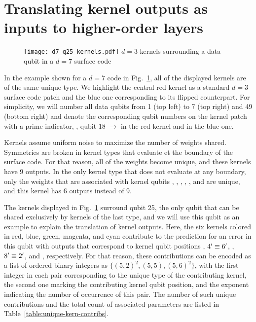\section{Translating kernel outputs as inputs to higher-order layers}

\begin{figure*}[htb]
\centering
\texttt{[image: d7\_q25\_kernels.pdf]}
\ccaption
{$d=3$ kernels surrounding a data qubit in a $d=7$ surface code}
{
}
\label{fig:d7wkern}
\end{figure*}

In the example shown for a $d=7$ code in Fig.~\ref{fig:d7wkern}, all of the displayed kernels are of the same unique type. We highlight the central red kernel as a standard $d=3$ surface code patch and the blue one corresponding to its flipped counterpart. For simplicity, we will number all data qubits from 1 (top left) to 7 (top right) and 49 (bottom right) and denote the corresponding qubit numbers on the kernel patch with a prime indicator, \eg, qubit 18 $\rightarrow$  in the red kernel and  in the blue one.

Kernels assume uniform noise to maximize the number of weights shared. Symmetries are broken in kernel types that evaluate et the boundary of the surface code. For that reason, all of the weights become unique, and these kernels have 9 outputs. In the only kernel type that does not evaluate at any boundary, only the weights that are associated with kernel qubits , , , , , and  are unique, and this kernel has 6 outputs instead of 9.

The kernels displayed in Fig.~\ref{fig:d7wkern} surround qubit 25, the only qubit that can be shared exclusively by kernels of the last type, and we will use this qubit as an example to explain the translation of kernel outputs. Here, the six kernels colored in red, blue, green, magenta, and cyan contribute to the prediction for an error in this qubit with outputs that correspond to kernel qubit positions , $4^\prime\equiv6^\prime$, , $8^\prime\equiv2^\prime$, and , respectively. For that reason, these contributions can be encoded as a list of ordered binary integers as $\{(5,2)^2, (5,5), (5,6)^2\}$, with the first integer in each pair corresponding to the unique type of the contributing kernel, the second one marking the contributing kernel qubit position, and the exponent indicating the number of occurrence of this pair. The number of such unique contributions and the total count of associated parameters are listed in Table~\ref{table:unique-kern-contribs}.

